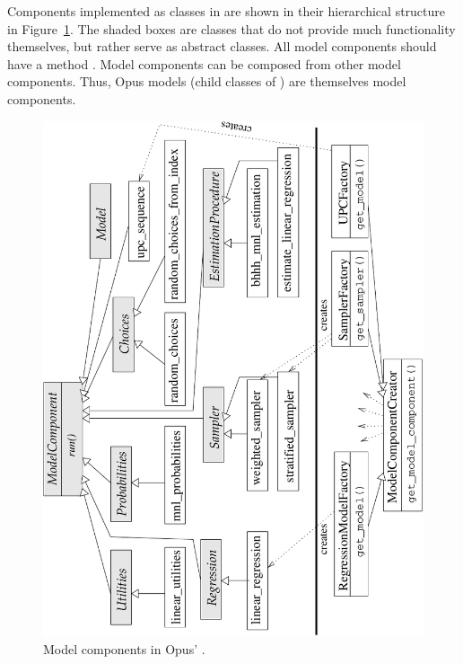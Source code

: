 {Components implemented as classes in  are shown in their hierarchical
structure in Figure~\ref{fig:model-components}. The shaded boxes are classes
that do not provide much functionality themselves, but rather serve as
abstract classes. All model components should have a method .
Model components can be composed from other model components.  Thus, Opus
models (child classes of ) are themselves model components.

\begin{figure}[t]
\begin{center}
\includegraphics[scale=0.8, angle=-90]{images/corecomponents.pdf}
\caption{\label{fig:model-components}\small Model components in Opus' .}

\end{center}
\end{figure}}
